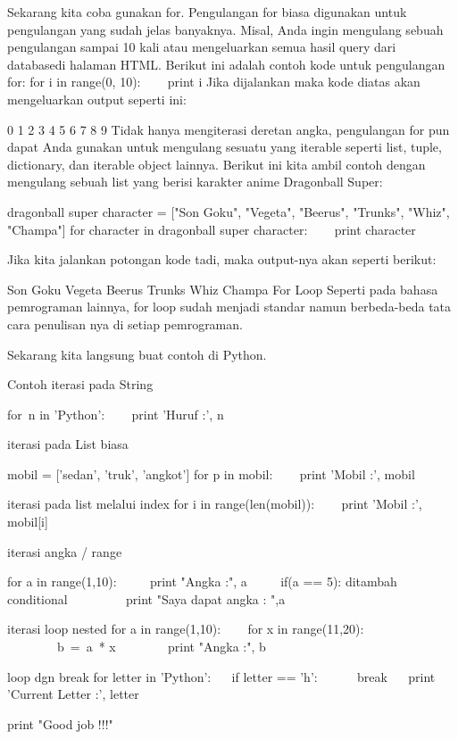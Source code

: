 Sekarang kita coba gunakan   for. Pengulangan   for   biasa digunakan untuk pengulangan yang sudah jelas banyaknya. Misal, Anda ingin mengulang sebuah pengulangan sampai 10 kali atau mengeluarkan semua hasil   query   dari   databasedi halaman HTML. Berikut ini adalah contoh kode untuk pengulangan   for: 
for i in range(0, 10): 
~~~ print i 
Jika dijalankan maka kode diatas akan mengeluarkan   output   seperti ini: 

0 
1 
2 
3 
4 
5 
6 
7 
8 
9 
Tidak hanya mengiterasi deretan angka, pengulangan   for   pun dapat Anda gunakan untuk mengulang sesuatu yang   iterable   seperti   list,   tuple,   dictionary, dan   iterable object   lainnya. Berikut ini kita ambil contoh dengan mengulang sebuah   list   yang berisi karakter anime Dragonball Super: 

dragonball     super     character = ["Son Goku", "Vegeta", "Beerus", "Trunks", "Whiz", "Champa"] 
for character in dragonball     super     character: 
~~~ print character 

Jika kita jalankan potongan kode tadi, maka   output-nya akan seperti berikut: 

Son Goku 
Vegeta 
Beerus 
Trunks 
Whiz 
Champa 
For Loop 
Seperti pada bahasa pemrograman lainnya, for loop sudah menjadi standar namun berbeda-beda tata cara penulisan nya di setiap pemrograman. 

Sekarang kita langsung buat contoh di Python.    


Contoh iterasi pada String  

for~n in 'Python':   
~~~ print 'Huruf :', n 

  
iterasi pada List biasa 

mobil = ['sedan', 'truk', 'angkot']  
for p in mobil: 
~~~ print 'Mobil :', mobil 


iterasi pada list melalui index 
for i in range(len(mobil)): 
~~~ print 'Mobil :', mobil[i] 

iterasi angka / range 

for a in range(1,10): 
~~~~ print "Angka :", a 
~~~~ if(a == 5):      ditambah conditional 
~~~~~~~~ print "Saya dapat angka : ",a 

iterasi loop nested 
for a in range(1,10): 
~~~ for x in range(11,20): 
~~~~~~~~b~=~a~* x      
~~~~~~~ print "Angka :", b 

loop dgn break 
for letter in 'Python': 
~~ if letter == 'h': 
~~~~~ break 
~~ print 'Current Letter :', letter 

print "Good job !!!" 

